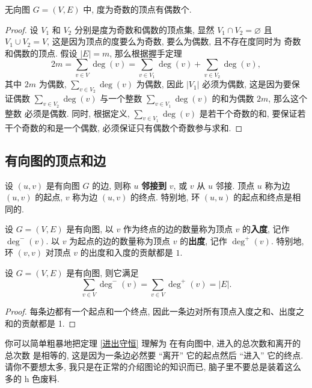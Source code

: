 \documentclass[10pt,UTF8]{book} %
\begin{document}
\begin{thm}
    无向图 $G = (V,E)$ 中, 度为奇数的顶点有偶数个.
    \begin{proof}
        设 $V_1$ 和 $V_2$ 分别是度为奇数和偶数的顶点集, 显然 $V_1 \cap V_2 = \varnothing$
        且 $V_1 \cup V_2 = V$, 这是因为顶点的度要么为奇数, 要么为偶数, 且不存在度同时为
        奇数和偶数的顶点. 假设 $|E| = m$, 那么根据握手定理
        \[ 2m = \sum_{v \in V}\deg(v)
        = \sum_{v \in V_1}\deg(v) + \sum_{v \in V_2}\deg(v), \]
        其中 $2m$ 为偶数, $\sum_{v \in V_2}\deg(v)$ 为偶数, 因此
        $|V_1|$ 必须为偶数, 这是因为要保证偶数 $\sum_{v \in V_2}\deg(v)$
        与一个整数 $\sum_{v \in V_1}\deg(v)$ 的和为偶数 $2m$, 那么这个整数
        必须是偶数. 同时, 根据定义, $\sum_{v \in V_1}\deg(v)$ 是若干个奇数的和,
        要保证若干个奇数的和是一个偶数, 必须保证只有偶数个奇数参与求和.
    \end{proof}
\end{thm}

\subsection{有向图的顶点和边}

\begin{definition}
    设 $(u,v)$ 是有向图 $G$ 的边, 则称 $u$ \textbf{邻接到} $v$, 或
    $v$ 从 $u$ 邻接. 顶点 $u$ 称为边 $(u, v)$ 的起点, $v$ 称为边 $(u,v)$ 的终点.
    特别地, 环 $(u, u)$ 的起点和终点是相同的.
\end{definition}

\begin{definition}
    设 $G=(V, E)$ 是有向图, 以 $v$ 作为终点的边的数量称为顶点 $v$ 的\textbf{入度},
    记作 $\deg^-(v)$. 以 $v$ 为起点的边的数量称为顶点 $v$ 的\textbf{出度},
    记作 $\deg^+(v)$. 特别地, 环 $(v,v)$ 对顶点 $v$ 的出度和入度的贡献都是 $1$.
\end{definition}

\begin{thm}
    \label{进出守恒}
    设 $G = (V,E)$ 是有向图, 则它满足
    \[ \sum_{v \in V} \deg^-(v)
    = \sum_{v \in V} \deg^+(v) = |E|. \]
    \begin{proof}
        每条边都有一个起点和一个终点, 因此一条边对所有顶点入度之和、出度之和的贡献都是 1.
    \end{proof}
\end{thm}

你可以简单粗暴地把定理 \ref{进出守恒} 理解为 {\kaishu 在有向图中, 进入的总次数和离开的总次数
是相等的}, 这是因为一条边必然要 “离开” 它的起点然后 “进入” 它的终点. 请你不要想太多,
我只是在正常的介绍图论的知识而已, 脑子里不要总是装着这么多的 h 色废料.
\end{document}
